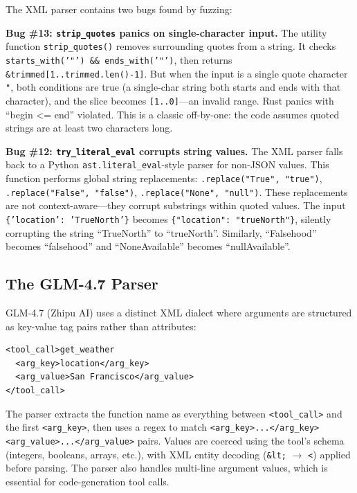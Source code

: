 The XML parser contains two bugs found by fuzzing:

\begin{bugbox}
\textbf{Bug \#13: \texttt{strip\_quotes} panics on single-character input.} The utility function \texttt{strip\_quotes()} removes surrounding quotes from a string. It checks \texttt{starts\_with('"') \&\& ends\_with('"')}, then returns \texttt{\&trimmed[1..trimmed.len()-1]}. But when the input is a single quote character \texttt{"}, both conditions are true (a single-char string both starts and ends with that character), and the slice becomes \texttt{[1..0]}---an invalid range. Rust panics with ``begin <= end'' violated. This is a classic off-by-one: the code assumes quoted strings are at least two characters long.
\end{bugbox}

\begin{bugbox}
\textbf{Bug \#12: \texttt{try\_literal\_eval} corrupts string values.} The XML parser falls back to a Python \texttt{ast.literal\_eval}-style parser for non-JSON values. This function performs global string replacements: \texttt{.replace("True", "true")}, \texttt{.replace("False", "false")}, \texttt{.replace("None", "null")}. These replacements are not context-aware---they corrupt substrings within quoted values. The input \texttt{\{'location': 'TrueNorth'\}} becomes \texttt{\{"location": "trueNorth"\}}, silently corrupting the string ``TrueNorth'' to ``trueNorth''. Similarly, ``Falsehood'' becomes ``falsehood'' and ``NoneAvailable'' becomes ``nullAvailable''.
\end{bugbox}

\subsection{The GLM-4.7 Parser}

GLM-4.7 (Zhipu AI) uses a distinct XML dialect where arguments are structured as key-value tag pairs rather than attributes:

\begin{verbatim}
<tool_call>get_weather
  <arg_key>location</arg_key>
  <arg_value>San Francisco</arg_value>
</tool_call>
\end{verbatim}

The parser extracts the function name as everything between \texttt{<tool\_call>} and the first \texttt{<arg\_key>}, then uses a regex to match \texttt{<arg\_key>...</arg\_key><arg\_value>...</arg\_value>} pairs. Values are coerced using the tool's schema (integers, booleans, arrays, etc.), with XML entity decoding (\texttt{\&lt;} $\rightarrow$ \texttt{<}) applied before parsing. The parser also handles multi-line argument values, which is essential for code-generation tool calls.

